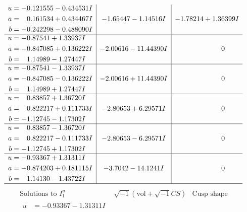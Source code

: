 \documentclass[1p]{elsarticle_modified}
\theoremstyle{definition}
\newcommand{\I}{\sqrt{-1}}
\begin{document}
$$\begin{array}{c|c|c}
\begin{aligned}
u &= -0.121555 - 0.434531 I \\
a &= \phantom{-}0.161534 + 0.434467 I \\
b &= -0.242298 - 0.488090 I\end{aligned}
 & -1.65447 - 1.14516 I & -1.78214 + 1.36399 I \\ \hline\begin{aligned}
u &= -0.87541 + 1.33937 I \\
a &= -0.847085 + 0.136222 I \\
b &= \phantom{-}1.14989 - 1.27447 I\end{aligned}
 & -2.00616 - 11.44390 I & \phantom{-0.000000 } 0 \\ \hline\begin{aligned}
u &= -0.87541 - 1.33937 I \\
a &= -0.847085 - 0.136222 I \\
b &= \phantom{-}1.14989 + 1.27447 I\end{aligned}
 & -2.00616 + 11.44390 I & \phantom{-0.000000 } 0 \\ \hline\begin{aligned}
u &= \phantom{-}0.83857 + 1.36720 I \\
a &= \phantom{-}0.822217 + 0.111733 I \\
b &= -1.12745 - 1.17302 I\end{aligned}
 & -2.80653 + 6.29571 I & \phantom{-0.000000 } 0 \\ \hline\begin{aligned}
u &= \phantom{-}0.83857 - 1.36720 I \\
a &= \phantom{-}0.822217 - 0.111733 I \\
b &= -1.12745 + 1.17302 I\end{aligned}
 & -2.80653 - 6.29571 I & \phantom{-0.000000 } 0 \\ \hline\begin{aligned}
u &= -0.93367 + 1.31311 I \\
a &= -0.874203 + 0.181115 I \\
b &= \phantom{-}1.14130 - 1.43722 I\end{aligned}
 & -3.7042 - 14.1241 I & \phantom{-0.000000 } 0\\
 \hline 
 \end{array}$$\newpage$$\begin{array}{c|c|c}  
\text{Solutions to }I^u_{1}& \I (\text{vol} + \sqrt{-1}CS) & \text{Cusp shape}\\
 \hline 
\begin{aligned}
u &= -0.93367 - 1.31311 I \\

\end{aligned}
\end{array}$$
\end{document}
